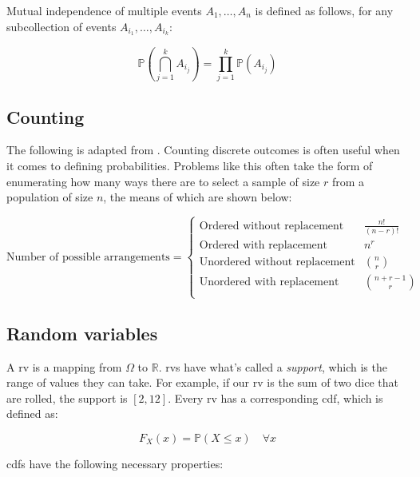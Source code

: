 \documentclass{report}
\begin{document}
Mutual independence of multiple events $A_1, \dots, A_n$ is defined as follows, for any subcollection of events $A_{i_1}, \dots, A_{i_k}$:

\begin{equation}\label{eq:mutual-independence}
    \mathbb{P}\left(\bigcap_{j=1}^k A_{i_j}\right) = \prod_{j=1}^k \mathbb{P}(A_{i_j})
\end{equation}

\subsection{Counting}

The following is adapted from \cite[Chapter~1.2.3]{casella_statistical_2002}. Counting discrete outcomes is often useful when it comes to defining probabilities. Problems like this often take the form of enumerating how many ways there are to select a sample of size $r$ from a population of size $n$, the means of which are shown below:

\begin{equation}\label{eq:counting}
    \text{Number of possible arrangements} = \begin{cases}
        \text{Ordered without replacement} & \frac{n!}{(n-r)!} \\
        \text{Ordered with replacement} & n^r \\
        \text{Unordered without replacement} & \binom{n}{r} \\
        \text{Unordered with replacement} & \binom{n+r-1}{r} \\
    \end{cases}
\end{equation}

\subsection{Random variables}

A \gls{rv} is a mapping from $\Omega$ to $\mathbb{R}$. \glspl{rv} have what's called a \textit{support}, which is the range of values they can take. For example, if our \gls{rv} is the sum of two dice that are rolled, the support is $[2, 12]$.  Every \gls{rv} has a corresponding \gls{cdf}, which is defined as:

\begin{equation}\label{eq:cdf}
    F_X(x) = \mathbb{P}(X \leq x) \quad \forall x
\end{equation}

\Glspl{cdf} have the following necessary properties:
\end{document}
